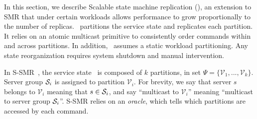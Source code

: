 
\label{sec:ssmr}

In this section, we describe Scalable state machine replication (\ssmr), an
extension to SMR that under certain workloads allows performance to grow
proportionally to the number of replicas. \ssmr\ partitions the service state
and replicates each partition. It relies on an atomic multicast primitive to
consistently order commands within and across partitions. In addition, \ssmr\
assumes a static workload partitioning. Any state reorganization requires system
shutdown and manual intervention.

In S-SMR~\cite{bezerra2014ssmr}, the service state \vvt\ is composed of $k$
partitions, in set $\Psi = \{\mathcal{V}_1, ..., \mathcal{V}_k\}$. Server group
$\mathcal{S}_i$ is assigned to partition $\mathcal{V}_i$. For brevity, we say that
server $s$ belongs to $\mathcal{V}_i$ meaning that $s \in \mathcal{S}_i$, and say
``multicast to $\mathcal{V}_i$'' meaning ``multicast to server group $\mathcal{S}_i$''.
S-SMR relies on an \emph{oracle}, which tells which partitions are accessed by
each command.

